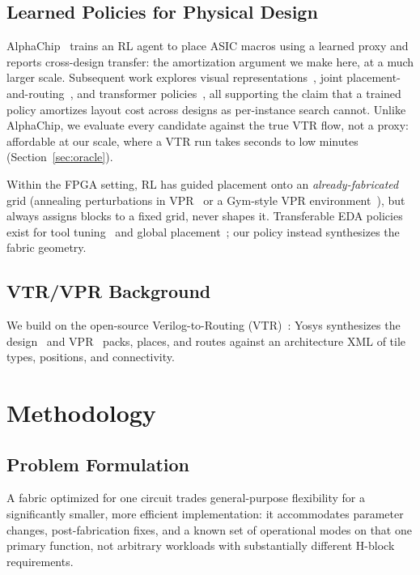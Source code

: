 \documentclass[sigconf]{acmart}
\begin{document}
\subsection{Learned Policies for Physical Design}

AlphaChip~\cite{alphachip} trains an RL agent to place
ASIC macros using a learned proxy and reports cross-design transfer:
the amortization argument we make here, at a much larger scale.
Subsequent work explores visual representations~\cite{maskplace}, joint
placement-and-routing~\cite{deeppr}, and transformer policies~\cite{chipformer},
all supporting the claim that a trained policy amortizes layout cost across
designs as per-instance search cannot. Unlike AlphaChip, we evaluate every
candidate against the true VTR flow, not a proxy: affordable at our
scale, where a VTR run takes seconds to low minutes (Section~\ref{sec:oracle}).

Within the FPGA setting, RL has guided placement onto an
\emph{already-fabricated} grid (annealing perturbations in
VPR~\cite{rlplace} or a Gym-style VPR environment~\cite{vprgym}), but
always assigns blocks to a fixed grid, never shapes it. Transferable EDA
policies exist for tool tuning~\cite{fasttuner} and global
placement~\cite{transplace}; our policy instead synthesizes the
fabric geometry.

\subsection{VTR/VPR Background}

We build on the open-source Verilog-to-Routing (VTR)~\cite{vtr9}:
Yosys synthesizes the design~\cite{parmys} and VPR~\cite{vpr97} packs, places, and routes
against an architecture XML of tile types, positions, and connectivity.

\section{Methodology}

\newcommand{\figisstandalone}{0}


\subsection{Problem Formulation}
\label{sec:problem}

A fabric optimized for one circuit trades general-purpose flexibility for
a significantly smaller, more efficient implementation: it accommodates
parameter changes, post-fabrication fixes, and a known set of operational
modes on that one primary function, not arbitrary workloads with
substantially different H-block requirements.
\end{document}
